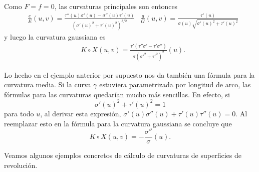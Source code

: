 \begin{example}
	Como $F=f=0$, las curvaturas principales son entonces 
	\begin{align*}
		&\frac{e}{E}(u,v)=\frac{\tau''(u)\sigma'(u)-\sigma''(u)\tau'(u)}{(\sigma'(u)^2+\tau'(u)^2)^{3/2}}
		&\frac{g}{G}(u,v)=\frac{\tau'(u)}{\sigma(u)\sqrt{\sigma'(u)^2+\tau'(u)^2}}
	\end{align*}
	y luego la curvatura gaussiana es
	\begin{align*}
		&K\circ X(u,v)=\frac{\tau'(\tau''\sigma'-\tau'\sigma'')}{\sigma (\sigma'^2+\tau'^2)^2 }(u).
	\end{align*}
\end{example}

Lo hecho en el ejemplo anterior por supuesto nos da también una fórmula para la
curvatura media.  Si la curva $\gamma$ estuviera parametrizada por longitud de
arco, las fórmulas para las curvaturas quedarían mucho más sencillas.  En
efecto, si 
\[
\sigma'(u)^2+\tau'(u)^2=1
\]
para todo $u$, al derivar esta expresión, 
$\sigma'(u)\sigma''(u)+\tau'(u)\tau''(u)=0$. Al reemplazar esto en la
fórmula para la curvatura gaussiana se concluye que
\[
	K\circ X(u,v)=-\frac{\sigma''}{\sigma}(u).
\]

Veamos algunos ejemplos concretos de cálculo de curvaturas de superficies de
revolución. 

